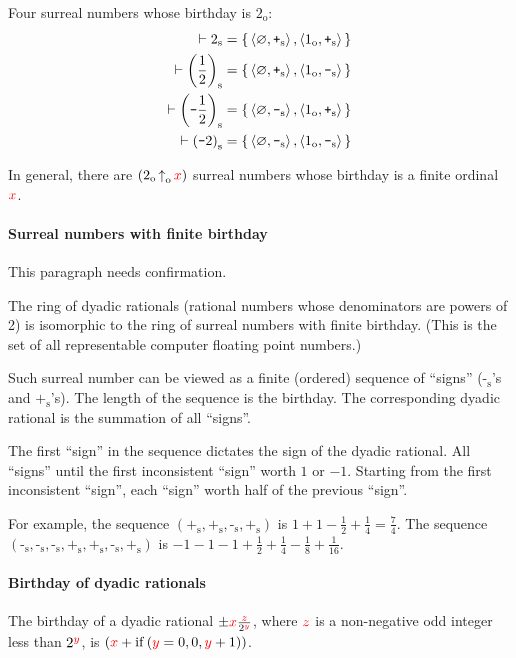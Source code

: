 \documentclass[12pt, letterpaper]{article}
\newcommand{\red}[1]{{\color{red} #1}}
\renewcommand{\emptyset}{\varnothing}
\newcommand{\provable}{\vdash}
\newcommand{\setvar}{\red}
\newcommand{\sx}{\setvar{x}}
\newcommand{\sy}{\setvar{y}}
\newcommand{\sz}{\setvar{z}}
\newcommand{\cif}[3]{\operatorname{if}\left({#1},{#2},{#3}\right)}
\newcommand{\ordsuf}[1]{{#1}_{\mathrm{o}}}
\newcommand{\expo}{\,\ordsuf{\uparrow}\,}
\newcommand{\oneo}{\ordsuf{1}}
\newcommand{\twoo}{\ordsuf{2}}
\newcommand{\opair}[2]{\left\langle{{#1},{#2}}\right\rangle}
\newcommand{\sur}[1]{{#1}_{\operatorname{s}}}
\newcommand{\sneg}{\sur{\texttt{-}}}
\newcommand{\spos}{\sur{\texttt{+}}}
\theoremstyle{definition}
\theoremstyle{remark}
\theoremstyle{definition}
\theoremstyle{plain}
\begin{document}
	Four surreal numbers whose birthday is $\twoo$:
	\[
	\begin{aligned}
		\provable \sur{2} &=\set{\opair{\emptyset}{\spos},\opair{\oneo}{\spos}}\\
		\provable \sur{\left(\frac{1}{2}\right)} &=\set{\opair{\emptyset}{\spos},\opair{\oneo}{\sneg}}\\
		\provable \sur{\left(\texttt{-}\frac{1}{2}\right)} &=\set{\opair{\emptyset}{\sneg},\opair{\oneo}{\spos}}\\
		\provable \sur{(\texttt{-}2)} &=\set{\opair{\emptyset}{\sneg},\opair{\oneo}{\sneg}}\\
	\end{aligned}
	\]
	
	In general, there are $(\twoo\expo\sx)$ surreal numbers whose birthday is a finite ordinal $\sx$.
	
	\paragraph{Surreal numbers with finite birthday}
	
	\red{This paragraph needs confirmation.}
	
	The ring of dyadic rationals (rational numbers whose denominators are powers of 2) is isomorphic to the ring of surreal numbers with finite birthday. (This is the set of all representable computer floating point numbers.) 
	
	Such surreal number can be viewed as a finite (ordered) sequence of ``signs'' ($\sneg$'s and $\spos$'s). 
	The length of the sequence is the birthday.
	The corresponding dyadic rational is the summation of all ``signs''.

	The first ``sign'' in the sequence dictates the sign of the dyadic rational. All ``signs'' until the first inconsistent ``sign'' worth $1$ or $-1$. Starting from the first inconsistent ``sign'', each ``sign'' worth half of the previous ``sign''.
	
	For example, the sequence $(\spos, \spos, \sneg, \spos)$ is $1+1-\frac{1}{2}+\frac{1}{4}=\frac{7}{4}$. The sequence $(\sneg, \sneg, \sneg, \spos, \spos, \sneg,\spos)$ is $-1-1-1+\frac{1}{2}+\frac{1}{4}-\frac{1}{8}+\frac{1}{16}$.
	
	\paragraph{Birthday of dyadic rationals}
	
	The birthday of a dyadic rational $\pm\sx\frac{\sz}{2^\sy}$, where $\sz$ is a non-negative odd integer less than $2^\sy$,
	is $(\sx+\cif{\sy=0}{0}{\sy+1})$.
	
\end{document}
